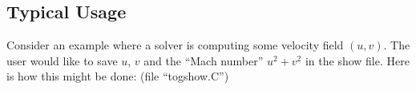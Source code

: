 \documentclass{article}
\begin{document}
% 
% 
% 
% 


\subsection{Typical Usage}

Consider an example where a solver is computing some velocity 
field $(u,v)$. The user would like to save $u$, $v$ and the
``Mach number'' $u^2+v^2$ in the show file. Here is how this
might be done: (file ``togshow.C'')
\end{document}
